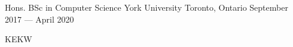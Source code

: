 

\begin{cventries}

  \cventry
    {Hons. BSc in Computer Science} %
    {York University} %
    {Toronto, Ontario} %
    {September 2017 — April 2020} %
    {
      \begin{cvitems} %
        \item {KEKW}
      \end{cvitems}
    }

\end{cventries}
